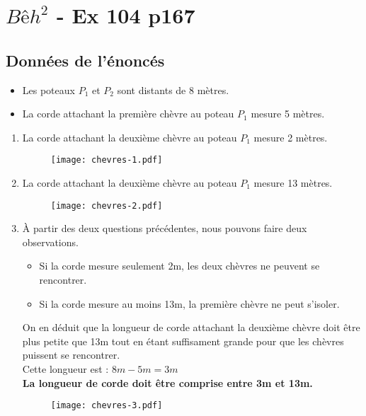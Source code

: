 \documentclass[11pt]{article}
\begin{document}
\section*{$Bêh^2$ - Ex 104 p167} %
\vspace{1cm}

\subsection*{Données de l'énoncés}

\begin{itemize}
\item Les poteaux $P_1$ et $P_2$ sont distants de 8 mètres.
\item La corde attachant la première chèvre au poteau $P_1$ mesure 5 mètres.
\end{itemize}

\setlength{\columnseprule}{1pt}
\begin{multicols}{2}


\begin{enumerate}
\item La corde attachant la deuxième chèvre au poteau $P_1$ mesure 2 mètres.
\begin{figure}[H]
  \centering
  \texttt{[image: chevres-1.pdf]}
\end{figure}

\item La corde attachant la deuxième chèvre au poteau $P_1$ mesure 13 mètres.
\begin{figure}[H]
  \centering
  \texttt{[image: chevres-2.pdf]}
\end{figure}

\item À partir des deux questions précédentes, nous pouvons faire deux observations.

\begin{itemize}
\item Si la corde mesure seulement 2m, les deux chèvres ne peuvent se rencontrer.
\item Si la corde mesure au moins 13m, la première chèvre ne peut s'isoler.
\end{itemize}
On en déduit que la longueur de corde attachant la deuxième chèvre doit être plus petite que 13m tout en étant suffisament grande pour que les chèvres puissent se rencontrer.\\
Cette longueur est : $8m - 5m = 3m$\\
\textbf{La longueur de corde doit être comprise entre 3m et 13m.}
\begin{figure}[H]
  \centering
  \texttt{[image: chevres-3.pdf]}
\end{figure}
\end{enumerate}
\end{multicols}
\end{document}
